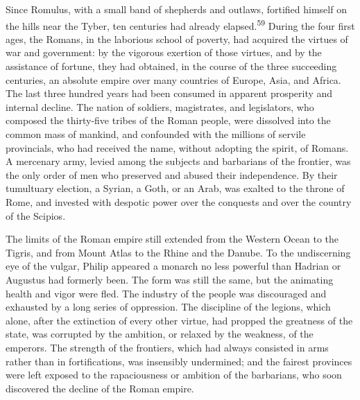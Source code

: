 Since Romulus, with a small band of shepherds
and outlaws, fortified himself on the hills near the Tyber, ten
centuries had already elapsed.\textsuperscript{59} During the four first ages, the
Romans, in the laborious school of poverty, had acquired the
virtues of war and government: by the vigorous exertion of those
virtues, and by the assistance of fortune, they had obtained, in
the course of the three succeeding centuries, an absolute empire
over many countries of Europe, Asia, and Africa. The last three
hundred years had been consumed in apparent prosperity and
internal decline. The nation of soldiers, magistrates, and
legislators, who composed the thirty-five tribes of the Roman
people, were dissolved into the common mass of mankind, and
confounded with the millions of servile provincials, who had
received the name, without adopting the spirit, of Romans. A
mercenary army, levied among the subjects and barbarians of the
frontier, was the only order of men who preserved and abused
their independence. By their tumultuary election, a Syrian, a
Goth, or an Arab, was exalted to the throne of Rome, and invested
with despotic power over the conquests and over the country of
the Scipios.


The limits of the Roman empire still extended from the Western
Ocean to the Tigris, and from Mount Atlas to the Rhine and the
Danube. To the undiscerning eye of the vulgar, Philip appeared a
monarch no less powerful than Hadrian or Augustus had formerly
been. The form was still the same, but the animating health and
vigor were fled. The industry of the people was discouraged and
exhausted by a long series of oppression. The discipline of the
legions, which alone, after the extinction of every other virtue,
had propped the greatness of the state, was corrupted by the
ambition, or relaxed by the weakness, of the emperors. The
strength of the frontiers, which had always consisted in arms
rather than in fortifications, was insensibly undermined; and the
fairest provinces were left exposed to the rapaciousness or
ambition of the barbarians, who soon discovered the decline of
the Roman empire.

